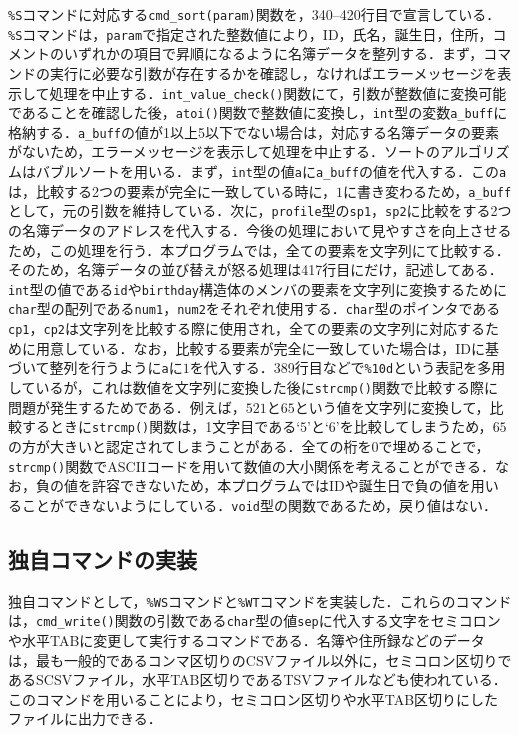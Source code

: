 \verb|%S|コマンドに対応する\verb|cmd_sort(param)|関数を，340--420行目で宣言している．\verb|%S|コマンドは，\verb|param|で指定された整数値により，ID，氏名，誕生日，住所，コメントのいずれかの項目で昇順になるように名簿データを整列する．まず，コマンドの実行に必要な引数が存在するかを確認し，なければエラーメッセージを表示して処理を中止する．\verb|int_value_check()|関数にて，引数が整数値に変換可能であることを確認した後，\verb|atoi()|関数で整数値に変換し，\verb|int|型の変数\verb|a_buff|に格納する．\verb|a_buff|の値が1以上5以下でない場合は，対応する名簿データの要素がないため，エラーメッセージを表示して処理を中止する．ソートのアルゴリズムはバブルソートを用いる\cite{book:algodata}．まず，\verb|int|型の値\verb|a|に\verb|a_buff|の値を代入する．この\verb|a|は，比較する2つの要素が完全に一致している時に，$1$に書き変わるため，\verb|a_buff|として，元の引数を維持している．次に，\verb|profile|型の\verb|sp1|，\verb|sp2|に比較をする2つの名簿データのアドレスを代入する．今後の処理において見やすさを向上させるため，この処理を行う．本プログラムでは，全ての要素を文字列にて比較する．そのため，名簿データの並び替えが怒る処理は417行目にだけ，記述してある．\verb|int|型の値である\verb|id|や\verb|birthday|構造体のメンバの要素を文字列に変換するために\verb|char|型の配列である\verb|num1|，\verb|num2|をそれぞれ使用する．\verb|char|型のポインタである\verb|cp1|，\verb|cp2|は文字列を比較する際に使用され，全ての要素の文字列に対応するために用意している．なお，比較する要素が完全に一致していた場合は，IDに基づいて整列を行うように\verb|a|に$1$を代入する．389行目などで\verb|%10d|という表記を多用しているが，これは数値を文字列に変換した後に\verb|strcmp()|関数で比較する際に問題が発生するためである．例えば，$521$と$65$という値を文字列に変換して，比較するときに\verb|strcmp()|関数は，1文字目である‘$5$’と‘$6$’を比較してしまうため，$65$の方が大きいと認定されてしまうことがある．全ての桁を0で埋めることで，\verb|strcmp()|関数でASCIIコードを用いて数値の大小関係を考えることができる．なお，負の値を許容できないため，本プログラムではIDや誕生日で負の値を用いることができないようにしている．\verb|void|型の関数であるため，戻り値はない．

\subsection{独自コマンドの実装}

独自コマンドとして，\verb|%WS|コマンドと\verb|%WT|コマンドを実装した．これらのコマンドは，\verb|cmd_write()|関数の引数である\verb|char|型の値\verb|sep|に代入する文字をセミコロンや水平TABに変更して実行するコマンドである．名簿や住所録などのデータは，最も一般的であるコンマ区切りのCSVファイル以外に，セミコロン区切りであるSCSVファイル，水平TAB区切りであるTSVファイルなども使われている．このコマンドを用いることにより，セミコロン区切りや水平TAB区切りにしたファイルに出力できる．

